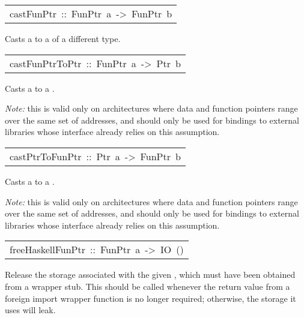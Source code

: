 \begin{haddockdesc}
\item[\begin{tabular}{@{}l}
castFunPtr\ ::\ FunPtr\ a\ ->\ FunPtr\ b
\end{tabular}]\haddockbegindoc
Casts a  to a  of a different type.
\par

\end{haddockdesc}
\begin{haddockdesc}
\item[\begin{tabular}{@{}l}
castFunPtrToPtr\ ::\ FunPtr\ a\ ->\ Ptr\ b
\end{tabular}]\haddockbegindoc
Casts a  to a .
\par
\emph{Note:} this is valid only on architectures where data and function
 pointers range over the same set of addresses, and should only be used
 for bindings to external libraries whose interface already relies on
 this assumption.
\par

\end{haddockdesc}
\begin{haddockdesc}
\item[\begin{tabular}{@{}l}
castPtrToFunPtr\ ::\ Ptr\ a\ ->\ FunPtr\ b
\end{tabular}]\haddockbegindoc
Casts a  to a .
\par
\emph{Note:} this is valid only on architectures where data and function
 pointers range over the same set of addresses, and should only be used
 for bindings to external libraries whose interface already relies on
 this assumption.
\par

\end{haddockdesc}
\begin{haddockdesc}
\item[\begin{tabular}{@{}l}
freeHaskellFunPtr\ ::\ FunPtr\ a\ ->\ IO\ ()
\end{tabular}]\haddockbegindoc
Release the storage associated with the given , which
 must have been obtained from a wrapper stub.  This should be called
 whenever the return value from a foreign import wrapper function is
 no longer required; otherwise, the storage it uses will leak.
\par

\end{haddockdesc}